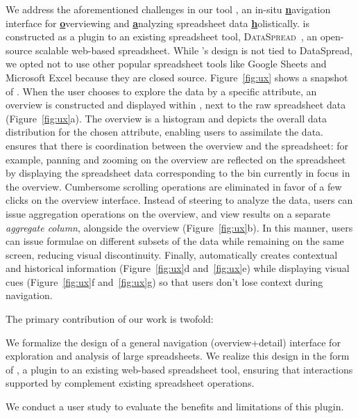 \noindent
We address the aforementioned challenges
in our tool \noah,
an in-situ
\textbf{\underline{n}}avigation interface
for \textbf{\underline{o}}verviewing
and \textbf{\underline{a}}nalyzing
spreadsheet data \textbf{\underline{h}}olistically.
\noah is constructed as a plugin to
an existing spreadsheet tool,
{\scshape DataSpread}~\cite{dataspread},
an open-source scalable web-based spreadsheet.
While \noah's design is not tied to {\sc DataSpread},
we opted not to use other popular spreadsheet
tools like Google Sheets and Microsoft Excel because they
are closed source.
Figure~\ref{fig:ux} shows a snapshot of \noah.
When the user chooses to explore
the data by a specific attribute,
an overview is constructed and displayed
within \noah, next to the raw spreadsheet data (Figure~\ref{fig:ux}a).
The overview is a histogram
and depicts the overall data distribution
for the chosen attribute,
enabling users to assimilate the data.
\noah ensures that there is coordination between
the overview and the spreadsheet:
for example, panning and zooming on the overview
are reflected on the spreadsheet by displaying
the spreadsheet data corresponding to the bin
currently in focus in the overview.
Cumbersome scrolling operations are eliminated in favor
of a few clicks on the overview interface.
Instead of steering to analyze the data,
users can issue aggregation operations
on the overview,
and view results on a separate {\em aggregate column},
alongside the overview (Figure~\ref{fig:ux}b).
In this manner,
users can issue formulae on different
subsets of the data while remaining on the same screen,
reducing visual discontinuity.
Finally, \noah automatically creates
contextual and historical information
(Figure~\ref{fig:ux}d and~\ref{fig:ux}e)
while displaying visual cues
(Figure~\ref{fig:ux}f and~\ref{fig:ux}g)
so that users don't lose context during navigation.

The primary contribution of our work is twofold:
\squishlist
\item We formalize the design of a general
navigation (overview+detail) interface
for exploration and analysis of large spreadsheets.
We realize this design in the form of \noah,
a plugin to an existing web-based spreadsheet tool,
ensuring that interactions supported by \noah
complement existing spreadsheet operations.
\item We conduct a user study to evaluate
the benefits and limitations of this plugin.
\squishend


